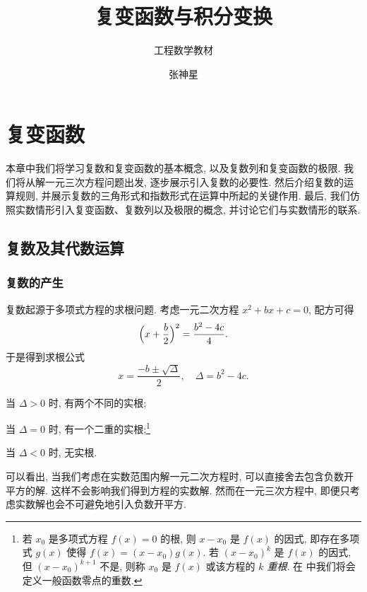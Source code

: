 \documentclass[11pt,a4paper,twoside,openright,scheme=chinese,no-math]{ctexbook}
\title{复变函数与积分变换}
\author{张神星}
\subtitle{工程数学教材}
\begin{document}
% 

\mainmatter

\chapter{复变函数}
\label{chapter:1}

  本章中我们将学习复数和复变函数的基本概念, 以及复数列和复变函数的极限. 我们将从解一元三次方程问题出发, 逐步展示引入复数的必要性. 然后介绍复数的运算规则, 并展示复数的三角形式和指数形式在运算中所起的关键作用. 最后, 我们仿照实数情形引入复变函数、复数列以及极限的概念, 并讨论它们与实数情形的联系.

\section{复数及其代数运算}

\subsection{复数的产生}
\label{ssec:motivation-complex-numbers}


复数起源于多项式方程的求根问题. 
考虑一元二次方程 $x^2+bx+c=0$, 配方可得
\[
  \Bigl(x+\frac b2\Bigr)^2=\frac{b^2-4c}4.
\]
于是得到求根公式
\[
  x=\frac{-b\pm\sqrt\Delta}2,\quad 
  \Delta=b^2-4c.
\]

\begin{enuma}
  \item 当 $\Delta>0$ 时, 有两个不同的实根;
  \item 当 $\Delta=0$ 时, 有一个二重的实根;\footnote{%
    若 $x_0$ 是多项式方程 $f(x)=0$ 的根, 则 $x-x_0$ 是 $f(x)$ 的因式, 即存在多项式 $g(x)$ 使得 $f(x)=(x-x_0)g(x)$.
    若 $(x-x_0)^k$ 是 $f(x)$ 的因式, 但 $(x-x_0)^{k+1}$ 不是, 则称 $x_0$ 是 $f(x)$ 或该方程的 \emph{$k$ 重根}.
    在 中我们将会定义一般函数零点的重数.
  }
  \item 当 $\Delta<0$ 时, 无实根.
\end{enuma}

可以看出, 当我们考虑在实数范围内解一元二次方程时, 可以直接舍去包含\alert{负数开平方}的解.
这样不会影响我们得到方程的实数解.
然而在一元三次方程中, 即便只考虑实数解也会不可避免地引入负数开平方.
\end{document}
